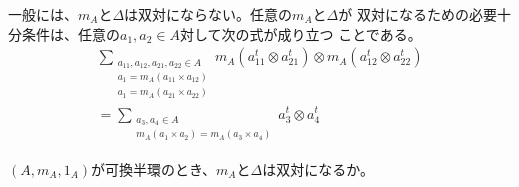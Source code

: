 	一般には、$m_A$と$\Delta$は双対にならない。任意の$m_A$と$\Delta$が
	双対になるための必要十分条件は、任意の$a_1,a_2\in A$対して次の式が成り立つ
	ことである。
	\begin{equation}\begin{split} %
		\sum_{\substack{a_{11},a_{12},a_{21},a_{22}\in A \\ a_1=m_A(a_{11}\times a_{12})\\ a_1=m_A(a_{21}\times a_{22})}}m_A(a_{11}^t\otimes a_{21}^t)\otimes m_A(a_{12}^t\otimes a_{22}^t) \\
		= \sum_{\substack{a_3,a_4\in A \\ m_A(a_1\times a_2)=m_A(a_3\times a_4)}}a_3^t\otimes a_4^t 
	\end{split}\end{equation} %

	\begin{problem}[可換の時]\label{prob:可換の時} %
		$(A,m_A,1_A)$が可換半環のとき、$m_A$と$\Delta$は双対になるか。
	\end{problem} %

